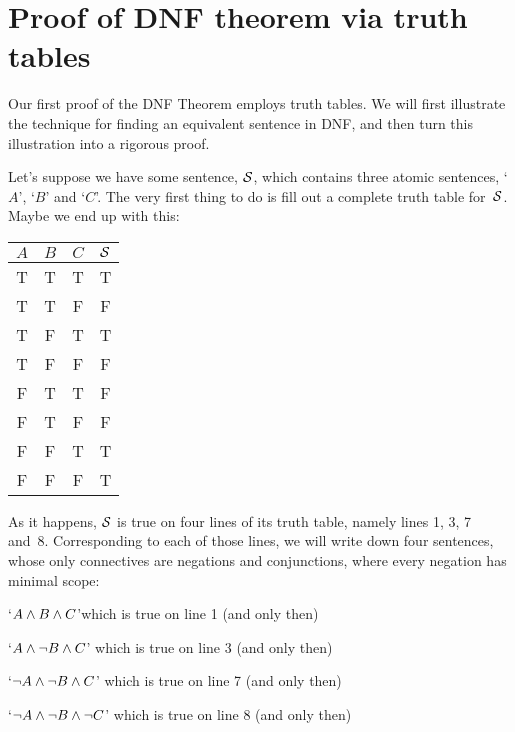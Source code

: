 \section{Proof of DNF theorem via truth tables}
\label{s:DNFTruthTable}

Our first proof of the DNF Theorem employs truth tables. We will first illustrate the technique for finding an equivalent sentence in DNF, and then turn this illustration into a rigorous proof.

Let's suppose we have some sentence, $\mathcal{S}$, which contains three atomic sentences, `$A$', `$B$' and `$C$'. The very first thing to do is fill out a complete truth table for~$\mathcal{S}$. Maybe we end up with this:
\begin{center}
\begin{tabular}{c c c | c}
$A$ & $B$ & $C$ & $\mathcal{S}$\\
\hline
 T & T & T & T \\
 T & T & F & F \\
 T & F & T & T \\
 T & F & F & F \\
 F & T & T & F \\
 F & T & F & F \\
 F & F & T & T \\
 F & F & F & T
\end{tabular}
\end{center}
%
%
As it happens, $\mathcal{S}$ is true on four lines of its truth table, namely lines 1, 3, 7 and~8. Corresponding to each of those lines, we will write down four sentences, whose only connectives are negations and conjunctions, where every negation has minimal scope:
	\begin{earg}
		\item  `$A \wedge B \wedge C$'\hfill which is true on line 1 (and only then)
		\item `$A \wedge \neg B \wedge C$' \hfill which is true on line 3 (and only then)
		\item `$\neg A \wedge \neg B \wedge C$' \hfill which is true on line 7 (and only then)
		\item `$\neg A \wedge \neg B \wedge \neg C$' \hfill which is true on line 8 (and only then)
	\end{earg}
